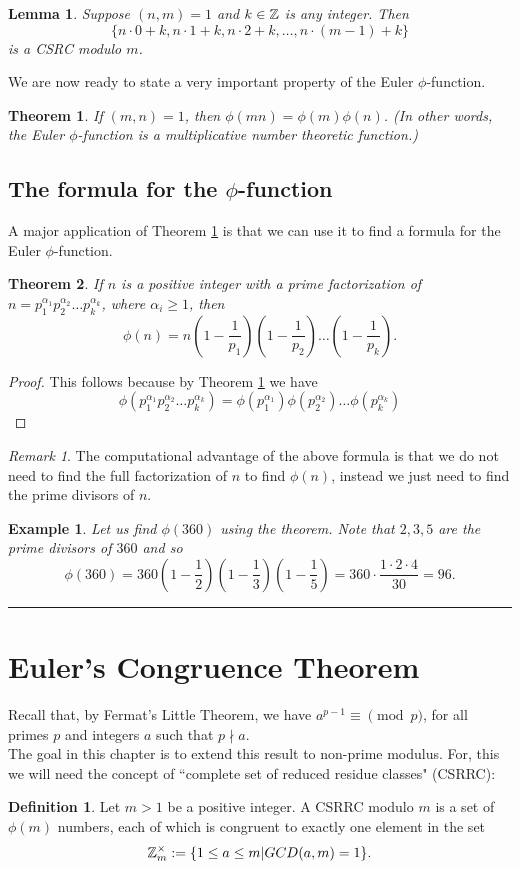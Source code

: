 \documentclass[12pt]{article}
\theoremstyle{plain}
\newtheorem{lemma}{Lemma}
\newtheorem{example}{Example}
\newtheorem{theorem}{Theorem}
\theoremstyle{definition}
\newtheorem{definition}{Definition}
\theoremstyle{remark}
\newtheorem{remark}{Remark}
\begin{document}
\bigskip
\noindent
\begin{lemma}
Suppose $(n,m)=1$ and $k\in \mathbb{Z}$ is any integer. Then
$$\{n\cdot 0+k, n\cdot 1+k, n\cdot 2+k, \dots, n\cdot(m-1)+k\}$$
is a CSRC modulo $m$.
\end{lemma}

\bigskip
\noindent
We are now ready to state a very important property of the Euler $\phi$-function.
\begin{theorem}\label{phi}
If $(m,n) = 1$, then $\phi(mn)=\phi(m)\phi(n)$. (In other words, the Euler $\phi$-function is a multiplicative number theoretic function.)
\end{theorem}

\subsection{The formula for the $\phi$-function}
A major application of Theorem \ref{phi} is that we can use it to find a formula for the Euler $\phi$-function.
\begin{theorem}\label{phi-formula}
If $n$ is a positive integer with a prime factorization of  $n=p_1^{\alpha_1}p_2^{\alpha_2} \dots p_k^{\alpha_k}$, where $\alpha_i\geq 1$, then 
$$\phi(n) = n\left(1-\frac{1}{p_1}\right)\left(1-\frac{1}{p_2}\right)\dots \left(1-\frac{1}{p_k}\right).$$
\end{theorem}
\begin{proof}
This follows because by Theorem \ref{phi} we have 
$$\phi(p_1^{\alpha_1}p_2^{\alpha_2} \dots p_k^{\alpha_k}) = \phi(p_1^{\alpha_1})\phi(p_2^{\alpha_2}) \dots \phi(p_k^{\alpha_k})$$
\end{proof}

\begin{remark}
The computational advantage of the above formula is that we do not need to find the full factorization of $n$ to find $\phi(n)$, instead we just need to find the prime divisors of $n$.  
\end{remark}

\bigskip
\noindent
\begin{example}
Let us find $\phi(360)$ using the theorem. Note that $2,3, 5$ are the prime divisors of $360$ and so 
$$\phi(360) = 360\left (1-\frac{1}{2}\right ) \left (1-\frac{1}{3}\right )\left (1-\frac{1}{5}\right ) = 360\cdot \frac{1\cdot 2\cdot 4}{30}=96.$$
\end{example}

\bigskip
\hrule
\section{Euler's Congruence Theorem}
Recall that, by Fermat's Little Theorem, we have $a^{p-1} \equiv \pmod{p}$, for all primes $p$ and integers $a$ such that $p\nmid a$. 
\\
The goal in this chapter is to extend this result to non-prime modulus.
For, this we will need the concept of ``complete set of reduced residue classes" (CSRRC):
\begin{definition}
Let $m>1$ be a positive integer. A CSRRC modulo $m$ is a set of $\phi(m)$ numbers, each of which is congruent to exactly one element in the set 
$$\mathbb{Z}_m^{\times}:= \{1\leq a\leq m| GCD(a,m)=1\}.$$
\end{definition}
\end{document}
